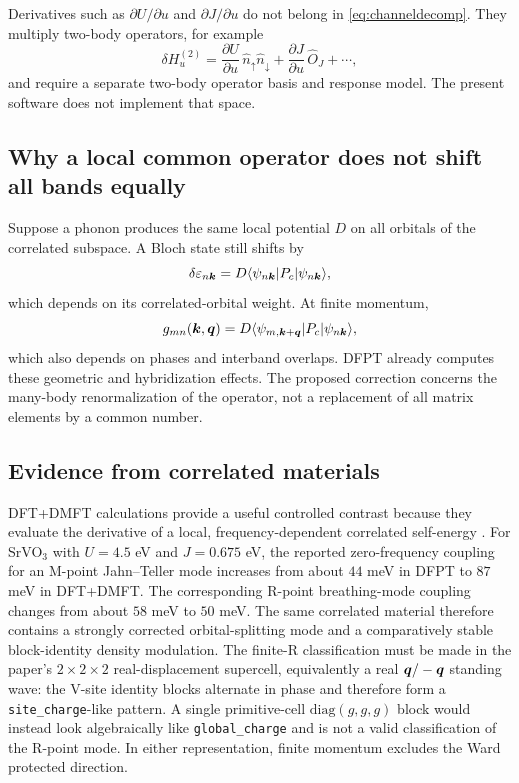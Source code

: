 Derivatives such as $\partial U/\partial u$ and $\partial J/\partial u$ do not
belong in \cref{eq:channeldecomp}.  They multiply two-body operators, for example
\begin{equation}
  \delta H^{(2)}_u
  =\frac{\partial U}{\partial u}\,
   \hat n_{\uparrow}\hat n_{\downarrow}
   +\frac{\partial J}{\partial u}\,\hat O_J+\cdots ,
  \label{eq:twobodyvertex}
\end{equation}
and require a separate two-body operator basis and response model.  The present
software does not implement that space.

\subsection{Why a local common operator does not shift all bands equally}

Suppose a phonon produces the same local potential $D$ on all orbitals of the
correlated subspace.  A Bloch state still shifts by
\begin{equation}
  \delta\varepsilon_{n\bm{k}}
  =D\langle\psi_{n\bm{k}}|P_c|\psi_{n\bm{k}}\rangle,
  \label{eq:bandweight}
\end{equation}
which depends on its correlated-orbital weight.  At finite momentum,
\begin{equation}
  g_{mn}(\bm{k},\bm{q})
  =D\langle\psi_{m,\bm{k}+\bm{q}}|P_c|\psi_{n\bm{k}}\rangle,
  \label{eq:finiteqweight}
\end{equation}
which also depends on phases and interband overlaps.  DFPT already computes these
geometric and hybridization effects.  The proposed correction concerns the
many-body renormalization of the operator, not a replacement of all matrix
elements by a common number.

\subsection{Evidence from correlated materials}

DFT+DMFT calculations provide a useful controlled contrast because they evaluate
the derivative of a local, frequency-dependent correlated self-energy
\citep{Abramovitch2025}.  For SrVO$_3$ with $U=4.5$ eV and $J=0.675$ eV, the
reported zero-frequency coupling for an M-point Jahn--Teller mode increases from
about $44$ meV in DFPT to $87$ meV in DFT+DMFT.  The corresponding R-point
breathing-mode coupling changes from about $58$ meV to $50$ meV.  The same
correlated material therefore contains a strongly corrected orbital-splitting
mode and a comparatively stable block-identity density modulation.  The finite-R
classification must be made in the paper's $2\times2\times2$ real-displacement
supercell, equivalently a real $\bm{q}/-\bm{q}$ standing wave: the V-site identity
blocks alternate in phase and therefore form a \texttt{site\_charge}-like
pattern.  A single primitive-cell $\mathrm{diag}(g,g,g)$ block would instead look
algebraically like \texttt{global\_charge} and is not a valid classification of
the R-point mode.  In either representation, finite momentum excludes the Ward
protected direction.

